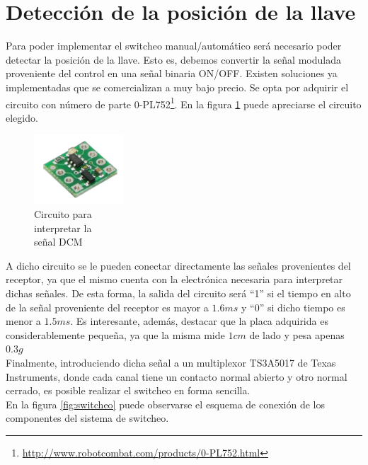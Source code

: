 \documentclass[main]{subfiles}
\begin{document}
\section{Detección de la posición de la llave}
Para poder implementar el switcheo manual/automático será necesario poder detectar la posición de la llave. Esto es, debemos convertir la señal modulada proveniente del control en una señal binaria ON/OFF. Existen soluciones ya implementadas que se comercializan a muy bajo precio. Se opta por adquirir el circuito con n\'umero de parte 0-PL752\footnote{\url{http://www.robotcombat.com/products/0-PL752.html}}. En la figura \ref{fig:circuito} puede apreciarse el circuito elegido.\\

\begin{figure}
\includegraphics[width=0.3\textwidth]{./pics_switcheo/placa.png}
\caption{Circuito para \\interpretar la \\señal DCM}
\label{fig:circuito}
\end{figure}

A dicho circuito se le pueden conectar directamente las señales provenientes del receptor, ya que el mismo cuenta con la electrónica necesaria para interpretar dichas señales. De esta forma, la salida del circuito será ``1'' si el tiempo en alto de la señal proveniente del receptor es mayor a $1.6ms$ y ``0'' si dicho tiempo es menor a $1.5ms$. Es interesante, además, destacar que la placa adquirida es considerablemente pequeña, ya que la misma mide $1cm$ de lado y pesa apenas $0.3g$\\

Finalmente, introduciendo dicha señal a un multiplexor TS3A5017 de Texas Instruments, donde cada canal tiene un contacto normal abierto y otro normal cerrado, es posible realizar el switcheo en forma sencilla.\\

En la figura \ref{fig:switcheo} puede observarse el esquema de conexión de los componentes del sistema de switcheo.\\
\end{document}
